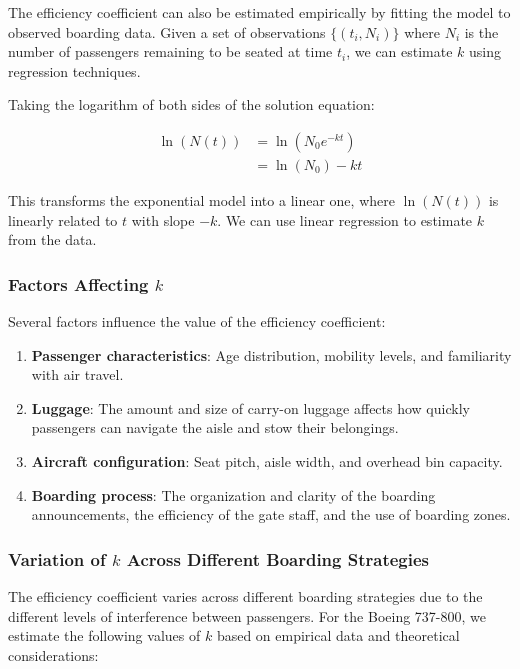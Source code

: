 \documentclass[12pt,a4paper]{article}
\begin{document}
The efficiency coefficient can also be estimated empirically by fitting the model to observed boarding data. Given a set of observations $\{(t_i, N_i)\}$ where $N_i$ is the number of passengers remaining to be seated at time $t_i$, we can estimate $k$ using regression techniques.

Taking the logarithm of both sides of the solution equation:

\begin{align}
\ln(N(t)) &= \ln(N_0 e^{-kt}) \\
&= \ln(N_0) - kt
\end{align}

This transforms the exponential model into a linear one, where $\ln(N(t))$ is linearly related to $t$ with slope $-k$. We can use linear regression to estimate $k$ from the data.

\subsubsection{Factors Affecting $k$}

Several factors influence the value of the efficiency coefficient:

\begin{enumerate}
    \item \textbf{Passenger characteristics}: Age distribution, mobility levels, and familiarity with air travel.
    \item \textbf{Luggage}: The amount and size of carry-on luggage affects how quickly passengers can navigate the aisle and stow their belongings.
    \item \textbf{Aircraft configuration}: Seat pitch, aisle width, and overhead bin capacity.
    \item \textbf{Boarding process}: The organization and clarity of the boarding announcements, the efficiency of the gate staff, and the use of boarding zones.
\end{enumerate}

\subsubsection{Variation of $k$ Across Different Boarding Strategies}

The efficiency coefficient varies across different boarding strategies due to the different levels of interference between passengers. For the Boeing 737-800, we estimate the following values of $k$ based on empirical data and theoretical considerations:
\end{document}
